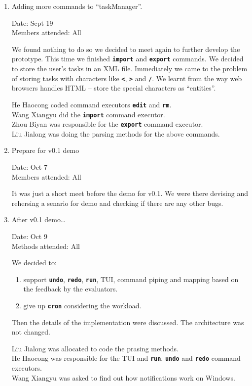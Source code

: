 \documentclass[12pt, a4paper]{article}
\newcommand{\cmdinline}[1]{{\bf \texttt{#1}}}
\begin{document}
\begin{enumerate}
\item Adding more commands to ``taskManager''.

Date: Sept 19\\
Members attended: All

We found nothing to do so we decided to meet again to further develop the prototype. This time we finished \cmdinline{import} and \cmdinline{export} commands. We decided to store the user's tasks in an XML file. Immediately we came to the problem of storing tasks with characters like \cmdinline{<}, \cmdinline{>} and \cmdinline{/}. We learnt from the way web browsers handles HTML -- store the special characters as ``entities''.

He Haocong coded command executors \cmdinline{edit} and \cmdinline{rm}.\\
Wang Xiangyu did the \cmdinline{import} command executor.\\
Zhou Biyan was responsible for the \cmdinline{export} command executor.\\
Liu Jialong was doing the parsing methods for the above commands.

\item Prepare for v0.1 demo

Date: Oct 7\\
Members attended: All

It was just a short meet before the demo for v0.1. We were there devising and rehersing a senario for demo and checking if there are any other bugs. 

\item After v0.1 demo\ldots

Date: Oct 9\\
Methods attended: All

We decided to:
\begin{enumerate}
\item  support \cmdinline{undo}, \cmdinline{redo}, \cmdinline{run}, TUI, command piping and mapping based on the feedback by the evaluators.
\item  give up \cmdinline{cron} considering the workload.
\end{enumerate}

Then the details of the implementation were discussed. The architecture was not changed.

Liu Jialong was allocated to code the prasing methods.\\
He Haocong was responsible for the TUI and \cmdinline{run}, \cmdinline{undo} and \cmdinline{redo} command executors.\\
Wang Xiangyu was asked to find out how notifications work on Windows.\\


\end{enumerate}
\end{document}
